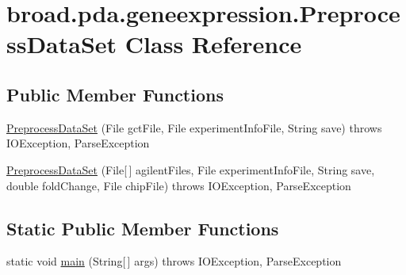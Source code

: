 \hypertarget{classbroad_1_1pda_1_1geneexpression_1_1_preprocess_data_set}{\section{broad.\+pda.\+geneexpression.\+Preprocess\+Data\+Set Class Reference}
\label{classbroad_1_1pda_1_1geneexpression_1_1_preprocess_data_set}
}
\subsection*{Public Member Functions}
\begin{DoxyCompactItemize}
\item 
\hyperlink{classbroad_1_1pda_1_1geneexpression_1_1_preprocess_data_set_a85dd9aaaae0c43ebc8781ceeabf2adda}{Preprocess\+Data\+Set} (File gct\+File, File experiment\+Info\+File, String save)  throws I\+O\+Exception, Parse\+Exception
\item 
\hyperlink{classbroad_1_1pda_1_1geneexpression_1_1_preprocess_data_set_ad737bde10f1636f15e7ef8bde8b0335b}{Preprocess\+Data\+Set} (File\mbox{[}$\,$\mbox{]} agilent\+Files, File experiment\+Info\+File, String save, double fold\+Change, File chip\+File)  throws I\+O\+Exception, Parse\+Exception
\end{DoxyCompactItemize}
\subsection*{Static Public Member Functions}
\begin{DoxyCompactItemize}
\item 
static void \hyperlink{classbroad_1_1pda_1_1geneexpression_1_1_preprocess_data_set_a677c3cd2ea3a8708e07efcdff29a8680}{main} (String\mbox{[}$\,$\mbox{]} args)  throws I\+O\+Exception, Parse\+Exception
\end{DoxyCompactItemize}


